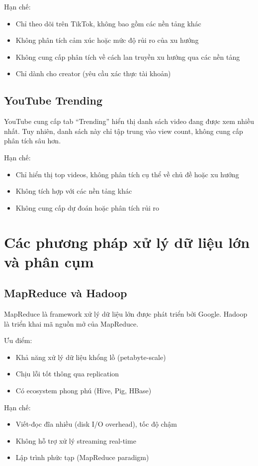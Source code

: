 Hạn chế:
\begin{itemize}
    \item Chỉ theo dõi trên TikTok, không bao gồm các nền tảng khác
    \item Không phân tích cảm xúc hoặc mức độ rủi ro của xu hướng
    \item Không cung cấp phân tích về cách lan truyền xu hướng qua các nền tảng
    \item Chỉ dành cho creator (yêu cầu xác thực tài khoản)
\end{itemize}

\subsection{YouTube Trending}

YouTube cung cấp tab ``Trending'' hiển thị danh sách video đang được xem nhiều nhất. Tuy nhiên, danh sách này chỉ tập trung vào view count, không cung cấp phân tích sâu hơn.

Hạn chế:
\begin{itemize}
    \item Chỉ hiển thị top videos, không phân tích cụ thể về chủ đề hoặc xu hướng
    \item Không tích hợp với các nền tảng khác
    \item Không cung cấp dự đoán hoặc phân tích rủi ro
\end{itemize}

\section{Các phương pháp xử lý dữ liệu lớn và phân cụm}

\subsection{MapReduce và Hadoop}

MapReduce là framework xử lý dữ liệu lớn được phát triển bởi Google. Hadoop là triển khai mã nguồn mở của MapReduce.

Ưu điểm:
\begin{itemize}
    \item Khả năng xử lý dữ liệu khổng lồ (petabyte-scale)
    \item Chịu lỗi tốt thông qua replication
    \item Có ecosystem phong phú (Hive, Pig, HBase)
\end{itemize}

Hạn chế:
\begin{itemize}
    \item Viết-đọc đĩa nhiều (disk I/O overhead), tốc độ chậm
    \item Không hỗ trợ xử lý streaming real-time
    \item Lập trình phức tạp (MapReduce paradigm)
\end{itemize}

